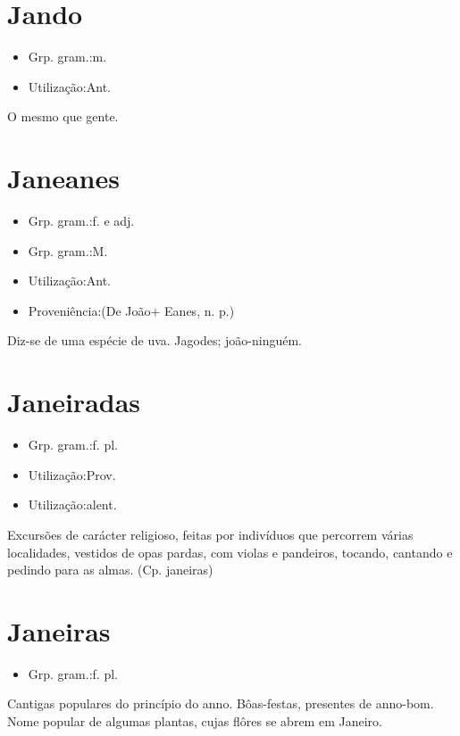 \documentclass{article}
\begin{document}
\section{Jando}
\begin{itemize}
\item {Grp. gram.:m.}
\end{itemize}
\begin{itemize}
\item {Utilização:Ant.}
\end{itemize}
O mesmo que \textunderscore gente\textunderscore .
\section{Janeanes}
\begin{itemize}
\item {Grp. gram.:f.  e  adj.}
\end{itemize}
\begin{itemize}
\item {Grp. gram.:M.}
\end{itemize}
\begin{itemize}
\item {Utilização:Ant.}
\end{itemize}
\begin{itemize}
\item {Proveniência:(De \textunderscore João\textunderscore  + \textunderscore Eanes\textunderscore , n. p.)}
\end{itemize}
Diz-se de uma espécie de uva.
Jagodes; joão-ninguém.
\section{Janeiradas}
\begin{itemize}
\item {Grp. gram.:f. pl.}
\end{itemize}
\begin{itemize}
\item {Utilização:Prov.}
\end{itemize}
\begin{itemize}
\item {Utilização:alent.}
\end{itemize}
Excursões de carácter religioso, feitas por indivíduos que percorrem várias localidades, vestidos de opas pardas, com violas e pandeiros, tocando, cantando e pedindo para as almas.
(Cp. \textunderscore janeiras\textunderscore )
\section{Janeiras}
\begin{itemize}
\item {Grp. gram.:f. pl.}
\end{itemize}
Cantigas populares do princípio do anno.
Bôas-festas, presentes de anno-bom.
Nome popular de algumas plantas, cujas flôres se abrem em Janeiro.
\end{document}
